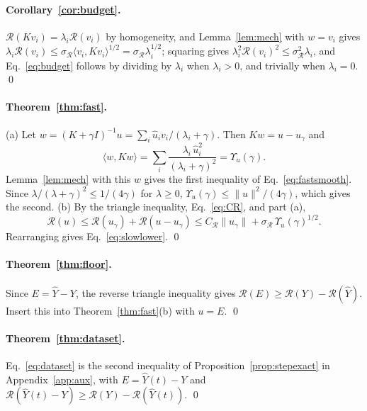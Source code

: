 \documentclass[11pt]{article}
\theoremstyle{definition}
\theoremstyle{remark}
\newcommand{\Rgh}{\mathcal{R}}           %
\newcommand{\sR}{\sigma_{\Rgh}}
\newcommand{\CR}{C_{\Rgh}}
\newcommand{\ip}[2]{\langle #1,#2\rangle}
\begin{document}
\paragraph{Corollary~\ref{cor:budget}.}
$\Rgh(Kv_i) = \lambda_i\Rgh(v_i)$ by homogeneity, and Lemma~\ref{lem:mech} with $w = v_i$ gives $\lambda_i\Rgh(v_i) \le \sR\ip{v_i}{Kv_i}^{1/2} = \sR\lambda_i^{1/2}$; squaring gives $\lambda_i^2\Rgh(v_i)^2\le\sR^2\lambda_i$, and Eq.~\eqref{eq:budget} follows by dividing by $\lambda_i$ when $\lambda_i > 0$, and trivially when $\lambda_i = 0$. \qed

\paragraph{Theorem~\ref{thm:fast}.}
(a) Let $w = (K+\gamma I)^{-1}u = \sum_i \hat u_i v_i/(\lambda_i+\gamma)$.
Then $Kw = u - u_\gamma$ and
\begin{equation*}
\ip{w}{Kw} = \sum_i\frac{\lambda_i\,\hat u_i^2}{(\lambda_i+\gamma)^2} = \Upsilon_u(\gamma).
\end{equation*}
Lemma~\ref{lem:mech} with this $w$ gives the first inequality of Eq.~\eqref{eq:fastsmooth}.
Since $\lambda/(\lambda+\gamma)^2 \le 1/(4\gamma)$ for $\lambda \ge 0$, $\Upsilon_u(\gamma) \le \|u\|^2/(4\gamma)$, which gives the second.
(b) By the triangle inequality, Eq.~\eqref{eq:CR}, and part (a),
\begin{equation*}
\Rgh(u) \le \Rgh(u_\gamma) + \Rgh(u - u_\gamma) \le \CR\|u_\gamma\| + \sR\,\Upsilon_u(\gamma)^{1/2}.
\end{equation*}
Rearranging gives Eq.~\eqref{eq:slowlower}. \qed

\paragraph{Theorem~\ref{thm:floor}.}
Since $E = \hat Y - Y$, the reverse triangle inequality gives $\Rgh(E) \ge \Rgh(Y) - \Rgh(\hat Y)$.
Insert this into Theorem~\ref{thm:fast}(b) with $u = E$. \qed

\paragraph{Theorem~\ref{thm:dataset}.}
Eq.~\eqref{eq:dataset} is the second inequality of Proposition~\ref{prop:stepexact} in Appendix~\ref{app:aux}, with $E = \hat Y(t) - Y$ and $\Rgh(\hat Y(t) - Y) \ge \Rgh(Y) - \Rgh(\hat Y(t))$. \qed
\end{document}
